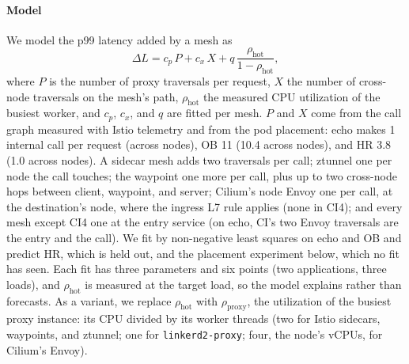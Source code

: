 \paragraph{Model}
We model the p99 latency added by a mesh as
\begin{equation}
  \Delta L = c_{p}\, P + c_{x}\, X + q\, \frac{\rho_{\text{hot}}}{1-\rho_{\text{hot}}},
  \label{eq:model}
\end{equation}
where $P$ is the number of proxy traversals per request, $X$ the number of
cross-node traversals on the mesh's path, $\rho_{\text{hot}}$ the measured CPU
utilization of the busiest worker, and $c_p$, $c_x$, and $q$ are fitted per
mesh. $P$ and $X$ come from the call graph measured with Istio telemetry and
from the pod placement: echo makes 1 internal call per request (across
nodes), OB 11 (10.4 across nodes), and HR 3.8 (1.0 across nodes). A sidecar
mesh adds two traversals per call; ztunnel one per node the call touches; the
waypoint one more per call, plus up to two cross-node hops between client,
waypoint, and server; Cilium's node Envoy one per call, at the destination's
node, where the ingress L7 rule applies (none in CI4); and every mesh except
CI4 one at the entry service (on echo, CI's two Envoy traversals are the entry
and the call). We fit by non-negative least
squares on echo and OB and predict HR, which is held out, and the placement
experiment below, which no fit has seen. Each fit has three parameters and six
points (two applications, three loads), and $\rho_{\text{hot}}$ is measured at
the target load, so the model explains rather than forecasts. As a variant,
we replace
$\rho_{\text{hot}}$ with $\rho_{\text{proxy}}$, the utilization of the busiest
proxy instance: its CPU divided by its worker threads (two for Istio sidecars,
waypoints, and ztunnel; one for \texttt{linkerd2-proxy}; four, the node's
vCPUs, for Cilium's Envoy).

